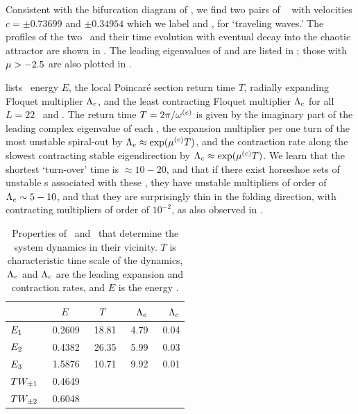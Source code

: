 Consistent with the bifurcation diagram of ,
we find two pairs of \reqva\  with velocities
$c =\pm 0.73699$ and $\pm 0.34954$
which we label  and ,
for `traveling waves.'
The profiles of the two \reqva\ and their time evolution
with eventual decay into the chaotic attractor are
shown in .  The leading eigenvalues of
 and  are listed in ;
those with $\eigRe > -2.5$ are also plotted in
.

 lists \eqv\ energy $E$,
the local Poincar\'e section return time $T$,
radially expanding Floquet multiplier $\Lambda_e$, and
the least contracting Floquet multiplier $\Lambda_c$
for all $L=22$ \eqva\ and \reqva.
The return time $T=2\pi/\eigIm[e]$ is given by the imaginary
part of the leading complex eigenvalue of each ,
the expansion
multiplier per one turn of the most unstable spiral-out by
$\ExpaEig_e\approx\exp(\eigRe[e] T)$, and the contraction
rate along the slowest contracting stable eigendirection by
$\ExpaEig_c\approx\exp(\eigRe[c]T)$. We learn that the shortest
`turn-over' time is $\approx 10-20$, and that if there exist
horseshoe sets of unstable \po s associated with
these \eqva,  they have unstable
multipliers of order of $\Lambda_e \sim 5-10$, and that
they are surprisingly thin in the folding direction, with
contracting multipliers of order of $10^{-2}$,
as also observed in .

\begin{table}[h!t]
    \caption[Characteristic
    time scales, expansion rates, contraction rates and energies of \eqva]{
    Properties of \eqva\ and \reqva\ that determine
    the system dynamics in their vicinity.  $T$ is characteristic
    time scale of the dynamics, $\Lambda_e$ and $\Lambda_c$ are the
    leading expansion and contraction rates, and $E$ is the
    energy .
            }
\begin{center} \footnotesize
    \begin{tabular}{l|rrrr}
                 & $E$~~   & $T$~~  & $\Lambda_e$  & $\Lambda_c$  \\ \hline
 $\EQV{1}\ $     &\ 0.2609 &\ 18.81 &\ 4.79     &\ 0.04 \\
 $\EQV{2}\ $     &\ 0.4382 &\ 26.35 &\ 5.99     &\ 0.03 \\
 $\EQV{3}\ $     &\ 1.5876 &\ 10.71 &\ 9.92     &\ 0.01 \\
 $TW_{\pm1}$ &\ 0.4649 &  &  & \\
 $TW_{\pm2}$ &\ 0.6048 &  &  & \\
    \end{tabular}
\end{center}
\label{tab:L22cminus}
\end{table}

